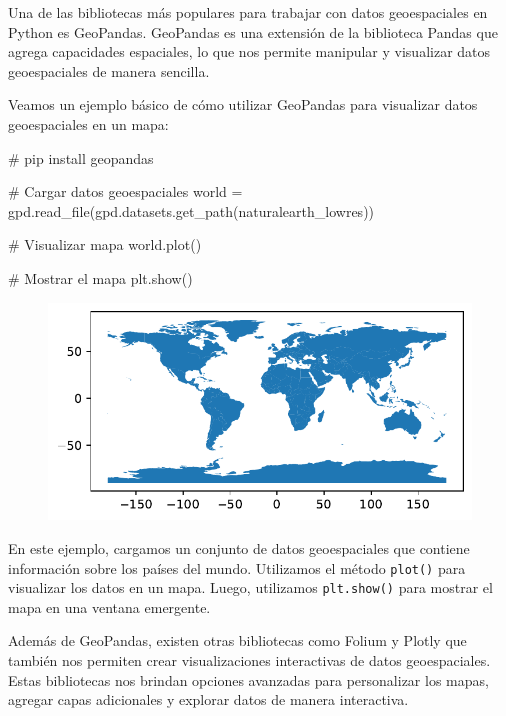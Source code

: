 \documentclass[
  a4paper,
]{article}
\newenvironment{Shaded}{}{}
\newcommand{\CommentTok}[1]{\textcolor[rgb]{0.42,0.45,0.49}{#1}}
\newcommand{\NormalTok}[1]{\textcolor[rgb]{0.14,0.16,0.18}{#1}}
\newcommand{\OperatorTok}[1]{\textcolor[rgb]{0.14,0.16,0.18}{#1}}
\newcommand{\StringTok}[1]{\textcolor[rgb]{0.01,0.18,0.38}{#1}}
\begin{document}
Una de las bibliotecas más populares para trabajar con datos
geoespaciales en Python es GeoPandas. GeoPandas es una extensión de la
biblioteca Pandas que agrega capacidades espaciales, lo que nos permite
manipular y visualizar datos geoespaciales de manera sencilla.

Veamos un ejemplo básico de cómo utilizar GeoPandas para visualizar
datos geoespaciales en un mapa:

\begin{Shaded}
\begin{Highlighting}[]
\CommentTok{\# pip install geopandas}

\CommentTok{\# Cargar datos geoespaciales}
\NormalTok{world }\OperatorTok{=}\NormalTok{ gpd.read\_file(gpd.datasets.get\_path(}\StringTok{\textquotesingle{}naturalearth\_lowres\textquotesingle{}}\NormalTok{))}

\CommentTok{\# Visualizar mapa}
\NormalTok{world.plot()}

\CommentTok{\# Mostrar el mapa}
\NormalTok{plt.show()}
\end{Highlighting}
\end{Shaded}

\begin{figure}[H]

{\centering \includegraphics{index_files/figure-pdf/cell-7-output-1.pdf}

}

\end{figure}

En este ejemplo, cargamos un conjunto de datos geoespaciales que
contiene información sobre los países del mundo. Utilizamos el método
\texttt{plot()} para visualizar los datos en un mapa. Luego, utilizamos
\texttt{plt.show()} para mostrar el mapa en una ventana emergente.

Además de GeoPandas, existen otras bibliotecas como Folium y Plotly que
también nos permiten crear visualizaciones interactivas de datos
geoespaciales. Estas bibliotecas nos brindan opciones avanzadas para
personalizar los mapas, agregar capas adicionales y explorar datos de
manera interactiva.
\end{document}
